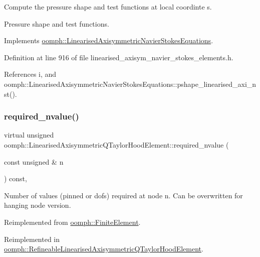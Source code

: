 Compute the pressure shape and test functions at local coordinte s. 

Pressure shape and test functions. 

Implements \hyperlink{classoomph_1_1LinearisedAxisymmetricNavierStokesEquations_ae2f6cf4a374c45a35ac1bea04ffced1f}{oomph\+::\+Linearised\+Axisymmetric\+Navier\+Stokes\+Equations}.



Definition at line 916 of file linearised\+\_\+axisym\+\_\+navier\+\_\+stokes\+\_\+elements.\+h.



References i, and oomph\+::\+Linearised\+Axisymmetric\+Navier\+Stokes\+Equations\+::pshape\+\_\+linearised\+\_\+axi\+\_\+nst().

\mbox{\label{classoomph_1_1LinearisedAxisymmetricQTaylorHoodElement_a4c7623e7e58ee1381789a1ac98a5a7d2}} 
\subsubsection{\texorpdfstring{required\+\_\+nvalue()}{required\_nvalue()}}
{\footnotesize\ttfamily virtual unsigned oomph\+::\+Linearised\+Axisymmetric\+Q\+Taylor\+Hood\+Element\+::required\+\_\+nvalue (\begin{DoxyParamCaption}\item[{const unsigned \&}]{n }\end{DoxyParamCaption}) const\hspace{0.3cm}{\ttfamily [inline]}, {\ttfamily [virtual]}}



Number of values (pinned or dofs) required at node n. Can be overwritten for hanging node version. 



Reimplemented from \hyperlink{classoomph_1_1FiniteElement_a56610c60d5bc2d7c27407a1455471b1a}{oomph\+::\+Finite\+Element}.



Reimplemented in \hyperlink{classoomph_1_1RefineableLinearisedAxisymmetricQTaylorHoodElement_a689a0ee05599e85b43b2cb484be70309}{oomph\+::\+Refineable\+Linearised\+Axisymmetric\+Q\+Taylor\+Hood\+Element}.




